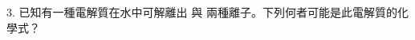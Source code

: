 \documentclass[12pt]{article}
\begin{document}
\begin{problem}
  \item[3.] 已知有一種電解質在水中可解離出  與  兩種離子。下列何者可能是此電解質的化學式？
  \begin{choices}
    \item {}
    \item {}
    \item {}
    \item {}
  \end{choices}
\end{problem}
\end{document}
